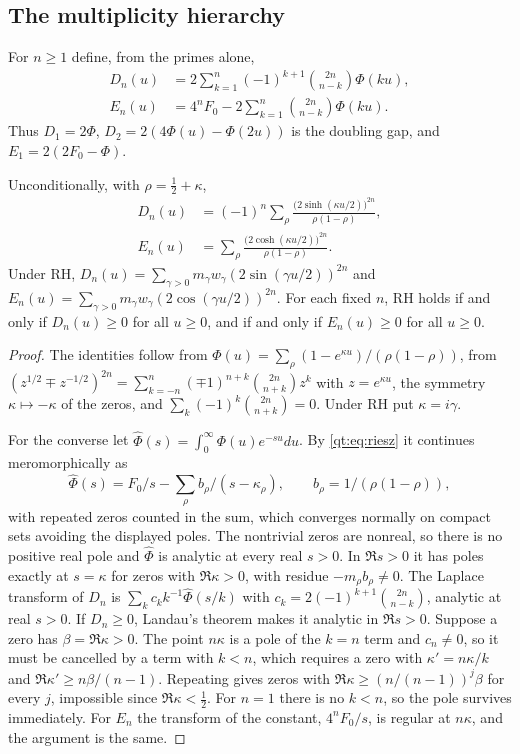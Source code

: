 \subsection{The multiplicity hierarchy}
For $n\ge1$ define, from the primes alone,
\begin{align*}
D_n(u)&=2\sum_{k=1}^n(-1)^{k+1}\binom{2n}{n-k}\Phi(ku),\\
E_n(u)&=4^nF_0-2\sum_{k=1}^n\binom{2n}{n-k}\Phi(ku).
\end{align*}
Thus $D_1=2\Phi$, $D_2=2(4\Phi(u)-\Phi(2u))$ is the doubling gap, and $E_1=2(2F_0-\Phi)$.
\begin{theorem}\label{st:thm:hier}
Unconditionally, with $\rho=\tfrac12+\kappa$,
\begin{align*}
D_n(u)&=(-1)^n\sum_\rho\frac{\big(2\sinh(\kappa u/2)\big)^{2n}}{\rho(1-\rho)},\\
E_n(u)&=\sum_\rho\frac{\big(2\cosh(\kappa u/2)\big)^{2n}}{\rho(1-\rho)} .
\end{align*}
Under RH, $D_n(u)=\sum_{\gamma>0}\allowbreak m_\gamma w_\gamma\allowbreak(2\sin(\gamma u/2))^{2n}$ and $E_n(u)=\sum_{\gamma>0}\allowbreak m_\gamma w_\gamma\allowbreak(2\cos(\gamma u/2))^{2n}$. For each fixed $n$, RH holds if and only if $D_n(u)\ge0$ for all $u\ge0$, and if and only if $E_n(u)\ge0$ for all $u\ge0$.
\end{theorem}
\begin{proof}
The identities follow from $\Phi(u)=\sum_\rho(1-e^{\kappa u})/(\rho(1-\rho))$, from $(z^{1/2}\mp z^{-1/2})^{2n}=\sum_{k=-n}^{n}(\mp1)^{n+k}\binom{2n}{n+k}z^k$ with $z=e^{\kappa u}$, the symmetry $\kappa\mapsto-\kappa$ of the zeros, and $\sum_k(-1)^k\binom{2n}{n+k}=0$. Under RH put $\kappa=i\gamma$.

For the converse let $\hat\Phi(s)=\int_0^\infty\Phi(u)e^{-su}du$. By \eqref{qt:eq:riesz} it continues meromorphically as
\[
\hat\Phi(s)=F_0/s-\sum_\rho b_\rho/(s-\kappa_\rho),\qquad b_\rho=1/(\rho(1-\rho)),
\]
with repeated zeros counted in the sum, which converges normally on compact sets avoiding the displayed poles. The nontrivial zeros are nonreal, so there is no positive real pole and $\hat\Phi$ is analytic at every real $s>0$. In $\Re s>0$ it has poles exactly at $s=\kappa$ for zeros with $\Re\kappa>0$, with residue $-m_\rho b_\rho\ne0$. The Laplace transform of $D_n$ is $\sum_kc_kk^{-1}\hat\Phi(s/k)$ with $c_k=2(-1)^{k+1}\binom{2n}{n-k}$, analytic at real $s>0$. If $D_n\ge0$, Landau's theorem makes it analytic in $\Re s>0$. Suppose a zero has $\beta=\Re\kappa>0$. The point $n\kappa$ is a pole of the $k=n$ term and $c_n\ne0$, so it must be cancelled by a term with $k<n$, which requires a zero with $\kappa'=n\kappa/k$ and $\Re\kappa'\ge n\beta/(n-1)$. Repeating gives zeros with $\Re\kappa\ge(n/(n-1))^j\beta$ for every $j$, impossible since $\Re\kappa<\tfrac12$. For $n=1$ there is no $k<n$, so the pole survives immediately. For $E_n$ the transform of the constant, $4^nF_0/s$, is regular at $n\kappa$, and the argument is the same.
\end{proof}
